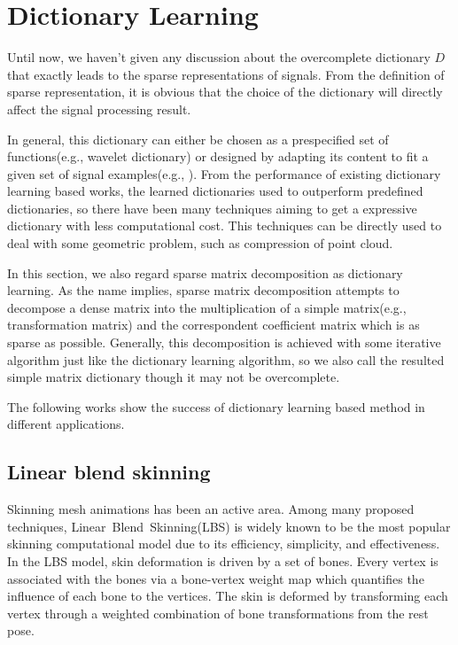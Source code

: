 \section{Dictionary Learning}
\label{sec:DictionaryLearning}

Until now, we haven't given any discussion about the overcomplete dictionary $D$ that exactly leads to the sparse representations of signals.
From the definition of sparse representation, it is obvious that the choice of the dictionary will directly affect the signal processing result.

In general, this dictionary can either be chosen as a prespecified set of functions(e.g., wavelet dictionary) or designed by adapting its content to fit a given set of signal examples(e.g., \cite{aharon2006svd}).
From the performance of existing dictionary learning based works, the learned dictionaries used to outperform predefined dictionaries,
so there have been many techniques aiming to get a expressive dictionary with less computational cost.
This techniques can be directly used to deal with some geometric problem, such as compression of point cloud\cite{digne2014self}.

In this section, we also regard sparse matrix decomposition as dictionary learning.
As the name implies, sparse matrix decomposition attempts to decompose a dense matrix into the multiplication of a simple matrix(e.g., transformation matrix\cite{le2012smooth}) and the correspondent coefficient matrix which is as sparse as possible.
Generally, this decomposition is achieved with some iterative algorithm just like the dictionary learning algorithm,
so we also call the resulted simple matrix dictionary though it may not be overcomplete.

The following works show the success of dictionary learning based method in different applications.

\subsection{Linear blend skinning}
\label{subsec:LBS}

Skinning mesh animations has been an active area.
Among many proposed techniques, Linear~Blend~Skinning(LBS) is widely known to be the most popular skinning computational model due to its efficiency, simplicity, and effectiveness.
In the LBS model, skin deformation is driven by a set of bones.
Every vertex is associated with the bones via a bone-vertex weight map which quantifies the influence of each bone to the vertices.
The skin is deformed by transforming each vertex through a weighted combination of bone transformations from the rest pose.

